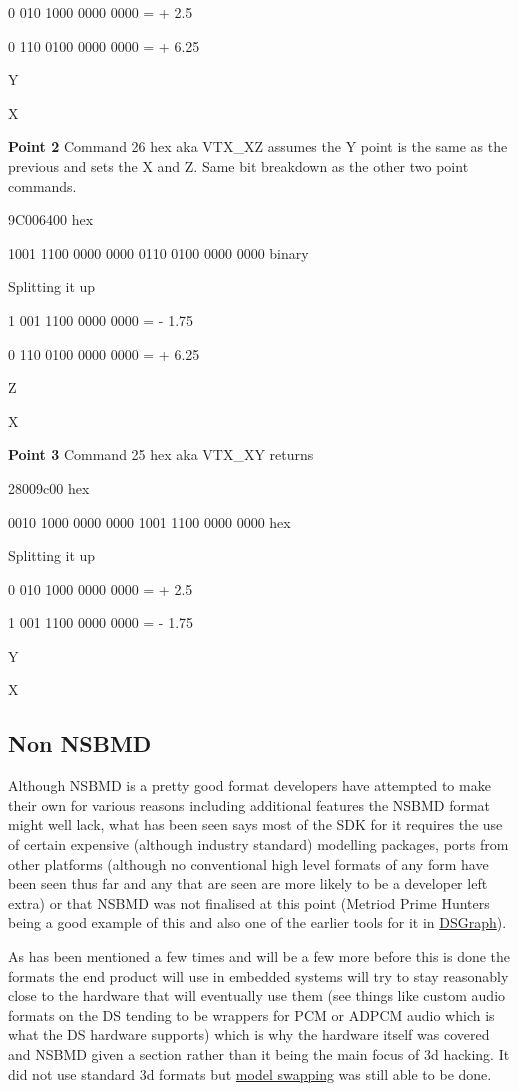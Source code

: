 \documentclass[
]{book}
\begin{document}
0 010 1000 0000 0000 = + 2.5

0 110 0100 0000 0000 = + 6.25

Y

X

\textbf{Point 2} Command 26 hex aka VTX\_XZ assumes the Y point is the same as the previous and sets the X and Z. Same bit breakdown as the other two point commands.

9C006400 hex

1001 1100 0000 0000 0110 0100 0000 0000 binary

Splitting it up

1 001 1100 0000 0000 = - 1.75

0 110 0100 0000 0000 = + 6.25

Z

X

\textbf{Point 3} Command 25 hex aka VTX\_XY returns

28009c00 hex

0010 1000 0000 0000 1001 1100 0000 0000 hex

Splitting it up

0 010 1000 0000 0000 = + 2.5

1 001 1100 0000 0000 = - 1.75

Y

X

\hypertarget{non-nsbmd}{%
\subsection{Non NSBMD}\label{non-nsbmd}}

Although NSBMD is a pretty good format developers have attempted to make their own for various reasons including additional features the NSBMD format might well lack, what has been seen says most of the SDK for it requires the use of certain expensive (although industry standard) modelling packages, ports from other platforms (although no conventional high level formats of any form have been seen thus far and any that are seen are more likely to be a developer left extra) or that NSBMD was not finalised at this point (Metriod Prime Hunters being a good example of this and also one of the earlier tools for it in \href{http://filetrip.net/nds-downloads/utilities/download-dsgraph-10-f29517.html}{DSGraph}).

As has been mentioned a few times and will be a few more before this is done the formats the end product will use in embedded systems will try to stay reasonably close to the hardware that will eventually use them (see things like custom audio formats on the DS tending to be wrappers for PCM or ADPCM audio which is what the DS hardware supports) which is why the hardware itself was covered and NSBMD given a section rather than it being the main focus of 3d hacking. It did not use standard 3d formats but \href{http://gbatemp.net/topic/109587-model-swapping-in-soma-bringer/}{model swapping} was still able to be done.
\end{document}
